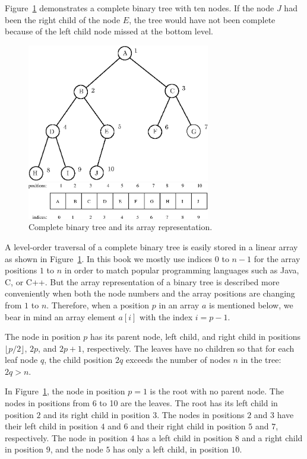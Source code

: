 \begin{Example} Figure~\ref{tree-fig} demonstrates a complete binary tree with 
ten nodes. If the node $J$ had been the right child of the node $E$, the
tree would have not been complete because of the left child node missed at the 
bottom level.
\end{Example}       
           
                                                
\begin{figure}[htb!]
\centerline{\includegraphics[width=80mm]{figs/tree-figTop.eps}}
\centerline{\includegraphics[width=80mm]{figs/tree-figBottom.eps}}
\caption{Complete binary tree and its array representation.}
\label{tree-fig} 
\end{figure}

A level-order traversal of a complete binary tree is easily stored
in a linear array as shown in Figure~\ref{tree-fig}. In this book 
we mostly use indices $0$ to $n-1$ for the array positions $1$ to $n$ 
in order to match popular programming languages such as Java, C, or C++. 
But the array representation of a binary tree is 
described more conveniently when both
the node numbers and the array positions are changing
from $1$ to $n$. Therefore, when a position $p$ in an array $a$
is mentioned below, we bear in mind 
an array element $a[i]$ with the index $i=p-1$.

The node in position $p$ has its parent node, left child, and right
child in positions $\lfloor p/2 \rfloor$, $2p$, and $2p + 1$,
respectively. The leaves have no children so that for each leaf node
$q$, the child position $2q$ exceeds the number of nodes $n$ in the
tree: $2q > n$.

\begin{Example}
In Figure~\ref{tree-fig},
the node in position $p=1$ is the root with no parent node. 
The nodes in positions from 6 to 10
are the leaves. The root has its
left child in position $2$ and its right child in position 
$3$. The nodes in positions $2$ and $3$ 
have their left child in position
$4$ and $6$ and their right child in position $5$ and $7$, respectively. 
The node in position $4$
has a left child in position $8$ and a right child in position
$9$, and the node $5$ has only a left child, in position $10$. 
\end{Example}

